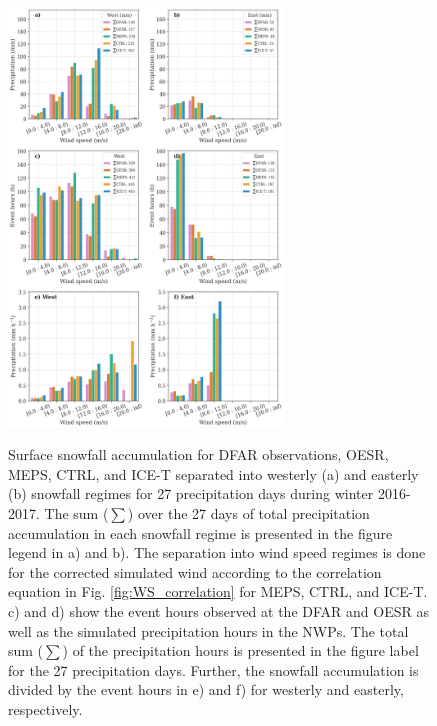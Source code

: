 \documentclass{ametsocV5}
\begin{document}
\begin{figure}
	\noindent\includegraphics[width=0.65\textwidth,angle=0]{fig7.png}\\
	\caption{Surface snowfall accumulation for DFAR observations, OESR, MEPS, CTRL, and ICE-T separated into westerly (a) and easterly (b) snowfall regimes for 27 precipitation days during winter 2016-2017. The sum ($\sum$) over the 27 days of total precipitation accumulation in each snowfall regime is presented in the figure legend in a) and b). The separation into wind speed regimes is done for the corrected simulated wind according to the correlation equation in Fig. \ref{fig:WS_correlation} for MEPS, CTRL, and ICE-T. c) and d) show the event hours observed at the DFAR and OESR as well as the simulated precipitation hours in the NWPs. The total sum ($\sum$) of the precipitation hours is presented in the figure label for the 27 precipitation days. Further, the snowfall accumulation is divided by the event hours in e) and f) for westerly and easterly, respectively.
	}
	\label{fig:sfc_WS_WD}
\end{figure}
\end{document}
